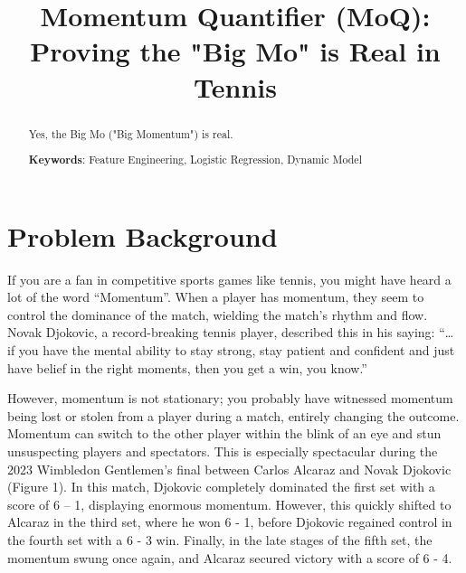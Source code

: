 \documentclass[12pt]{article}  %
\title{Momentum Quantifier (MoQ): Proving the "Big Mo" is Real in Tennis}  %
\begin{document}
\begin{abstract}
    
Yes, the Big Mo ("Big Momentum") is real.

\vspace{5pt}  %
\textbf{Keywords}: Feature Engineering, Logistic Regression, Dynamic Model

\end{abstract}

\maketitle  %



\tableofcontents  




\section{Problem Background}
If you are a fan in competitive sports games like tennis, you might have heard a lot of the word “Momentum”. When a player has momentum, they seem to control the dominance of the match, wielding the match's rhythm and flow. Novak Djokovic, a record-breaking tennis player, described this in his saying: “… if you have the mental ability to stay strong, stay patient and confident and just have belief in the right moments, then you get a win, you know.”

However, momentum is not stationary; you probably have witnessed momentum being lost or stolen from a player during a match, entirely changing the outcome. Momentum can switch to the other player within the blink of an eye and stun unsuspecting players and spectators. This is especially spectacular during the 2023 Wimbledon Gentlemen’s final between Carlos Alcaraz and Novak Djokovic (Figure 1). In this match, Djokovic completely dominated the first set with a score of 6 – 1, displaying enormous momentum. However, this quickly shifted to Alcaraz in the third set, where he won 6 - 1, before Djokovic regained control in the fourth set with a 6 - 3 win. Finally, in the late stages of the fifth set, the momentum swung once again, and Alcaraz secured victory with a score of 6 - 4.
\end{document}

